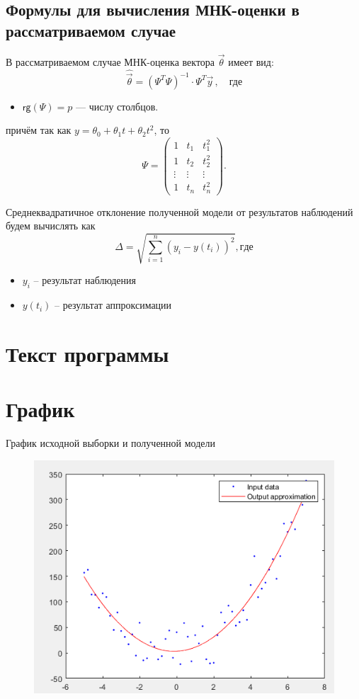\documentclass[a4paper, 12pt]{article}
\theoremstyle{definition}
\begin{document}
\subsection{Формулы для вычисления МНК-оценки в рассматриваемом случае}

В рассматриваемом случае МНК-оценка вектора $\vec{\theta}$ имеет вид:
\begin{equation}
\hat{\vec{\theta}} = (\Psi^T \Psi)^{-1} \cdot \Psi^T \vec{y}\,, \quad \text{где}
\end{equation}
\begin{itemize}
	\item $\mathsf{rg}(\Psi) = p$ --- числу столбцов.
\end{itemize}
причём так как $y = \theta_0 + \theta_1 t + \theta_2 t^2$, то
\begin{equation}
\Psi = \begin{pmatrix}
1      & t_1    & t_1^2  \\
1      & t_2    & t_2^2  \\
\vdots & \vdots & \vdots \\
1      & t_n    & t_n^2
\end{pmatrix}.
\end{equation}


Среднеквадратичное отклонение полученной модели от результатов наблюдений будем вычислять как
\begin{equation}
\Delta = \sqrt{\sum_{i=1}^{n}\left(y_i - y(t_i)\right)^2}, где
\end{equation}

\begin{itemize}
	\item $y_i$ -- результат наблюдения
	\item $y(t_i)$ -- результат аппроксимации
\end{itemize}

\section{Текст программы}



\section{График}

График исходной выборки и полученной модели

\begin{figure}[h]
	\centering
	\includegraphics[scale=1.0]{1.png}
\end{figure}
\end{document}
